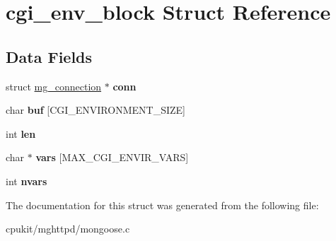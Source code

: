 \hypertarget{structcgi__env__block}{}\section{cgi\+\_\+env\+\_\+block Struct Reference}
\label{structcgi__env__block}
\subsection*{Data Fields}
\begin{DoxyCompactItemize}
\item 
\mbox{\label{structcgi__env__block_a690d939b7e443d589d89803b36a1a20d}} 
struct \mbox{\hyperlink{structmg__connection}{mg\+\_\+connection}} $\ast$ {\bfseries conn}
\item 
\mbox{\label{structcgi__env__block_acde439ca8be77fbb1061e760e3688d8d}} 
char {\bfseries buf} \mbox{[}C\+G\+I\+\_\+\+E\+N\+V\+I\+R\+O\+N\+M\+E\+N\+T\+\_\+\+S\+I\+ZE\mbox{]}
\item 
\mbox{\label{structcgi__env__block_a6455757faba75fde382e24e5bea25cb5}} 
int {\bfseries len}
\item 
\mbox{\label{structcgi__env__block_a292f1d13d56cd7872284da7221bbd8bb}} 
char $\ast$ {\bfseries vars} \mbox{[}M\+A\+X\+\_\+\+C\+G\+I\+\_\+\+E\+N\+V\+I\+R\+\_\+\+V\+A\+RS\mbox{]}
\item 
\mbox{\label{structcgi__env__block_ab409c99d6f905fe2e467aba8aa081fc4}} 
int {\bfseries nvars}
\end{DoxyCompactItemize}


The documentation for this struct was generated from the following file\+:\begin{DoxyCompactItemize}
\item 
cpukit/mghttpd/mongoose.\+c\end{DoxyCompactItemize}
